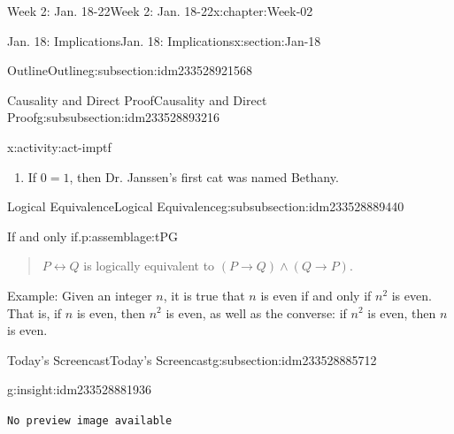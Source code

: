 \documentclass[oneside,10pt,]{book}
\newcommand{\mono}[1]{\texttt{#1}}
\numberwithin{equation}{section}
\newlength{\qrsize}
\newlength{\previewwidth}
\def\imp{\to}
\def\iff{\leftrightarrow}
\renewcommand{\iff}{\leftrightarrow}
\newcommand{\imp}{\rightarrow}
\begin{document}
\begin{chapterptx}{Week 2: Jan. 18-22}{}{Week 2: Jan. 18-22}{}{}{x:chapter:Week-02}
\begin{sectionptx}{Jan. 18: Implications}{}{Jan. 18: Implications}{}{}{x:section:Jan-18}
\begin{subsectionptx}{Outline}{}{Outline}{}{}{g:subsection:idm233528921568}
\begin{subsubsectionptx}{Causality and Direct Proof}{}{Causality and Direct Proof}{}{}{g:subsubsection:idm233528893216}
\begin{activity}{}{x:activity:act-imptf}
\begin{enumerate}
\item{}If \(0=1\), then Dr. Janssen's first cat was named Bethany.%
\end{enumerate}
\end{activity}%
\end{subsubsectionptx}
%
%
\typeout{************************************************}
\typeout{************************************************}
%
\begin{subsubsectionptx}{Logical Equivalence}{}{Logical Equivalence}{}{}{g:subsubsection:idm233528889440}
\begin{assemblage}{If and only if.}{p:assemblage:tPG}%
\begin{quote}%
\(P \iff Q\) is logically equivalent to \((P \imp Q) \wedge (Q \imp P)\).%
\end{quote}
Example: Given an integer \(n\), it is true that \(n\) is even if and only if \(n^2\) is even. That is, if \(n\) is even, then \(n^2\) is even, as well as the converse: if \(n^2\) is even, then \(n\) is even.%
\end{assemblage}
\end{subsubsectionptx}
\end{subsectionptx}
%
%
\typeout{************************************************}
\typeout{************************************************}
%
\begin{subsectionptx}{Today's Screencast}{}{Today's Screencast}{}{}{g:subsection:idm233528885712}
\begin{insight}{}{g:insight:idm233528881936}%
\setlength{\qrsize}{9em}
\setlength{\previewwidth}{\linewidth}
\addtolength{\previewwidth}{-\qrsize}
\begin{tcbraster}[raster columns=2, raster column skip=1pt, raster halign=center, raster force size=false, raster left skip=0pt, raster right skip=0pt]%
\begin{tcolorbox}[previewstyle, width=\previewwidth]%
\mono{No preview image available}%
\end{tcolorbox}%
\begin{tcolorbox}[qrstyle]%
[QR LINK]\end{tcolorbox}%
\end{tcbraster}%
\end{insight}
\end{subsectionptx}
%
%
\typeout{************************************************}
\typeout{************************************************}

\end{sectionptx}
\end{chapterptx}
\end{document}

